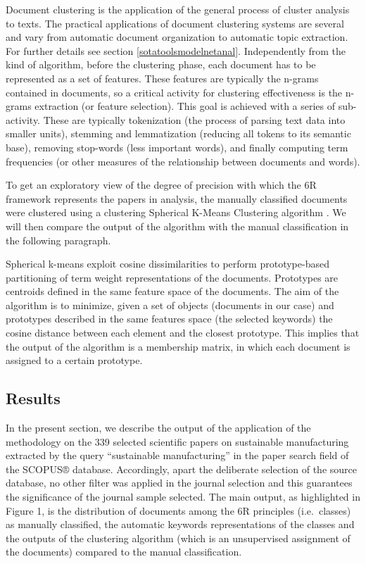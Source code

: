 \documentclass[]{book}
\theoremstyle{definition}
\theoremstyle{definition}
\theoremstyle{definition}
\theoremstyle{remark}
\begin{document}
Document clustering is the application of the general process of cluster
analysis to texts. The practical applications of document clustering
systems are several and vary from automatic document organization to
automatic topic extraction. For further details see section
\ref{sotatoolsmodelnetanal}. Independently from the kind of algorithm,
before the clustering phase, each document has to be represented as a
set of features. These features are typically the n-grams contained in
documents, so a critical activity for clustering effectiveness is the
n-grams extraction (or feature selection). This goal is achieved with a
series of sub-activity. These are typically tokenization (the process of
parsing text data into smaller units), stemming and lemmatization
(reducing all tokens to its semantic base), removing stop-words (less
important words), and finally computing term frequencies (or other
measures of the relationship between documents and words).

To get an exploratory view of the degree of precision with which the 6R
framework represents the papers in analysis, the manually classified
documents were clustered using a clustering Spherical K-Means Clustering
algorithm \citep{buchta2012spherical}. We will then compare the output
of the algorithm with the manual classification in the following
paragraph.

Spherical k-means exploit cosine dissimilarities to perform
prototype-based partitioning of term weight representations of the
documents. Prototypes are centroids defined in the same feature space of
the documents. The aim of the algorithm is to minimize, given a set of
objects (documents in our case) and prototypes described in the same
features space (the selected keywords) the cosine distance between each
element and the closest prototype. This implies that the output of the
algorithm is a membership matrix, in which each document is assigned to
a certain prototype.

\subsection{Results}\label{results-3}

In the present section, we describe the output of the application of the
methodology on the 339 selected scientific papers on sustainable
manufacturing extracted by the query ``sustainable manufacturing'' in
the paper search field of the SCOPUS® database. Accordingly, apart the
deliberate selection of the source database, no other filter was applied
in the journal selection and this guarantees the significance of the
journal sample selected. The main output, as highlighted in Figure 1, is
the distribution of documents among the 6R principles (i.e.~classes) as
manually classified, the automatic keywords representations of the
classes and the outputs of the clustering algorithm (which is an
unsupervised assignment of the documents) compared to the manual
classification.
\end{document}
